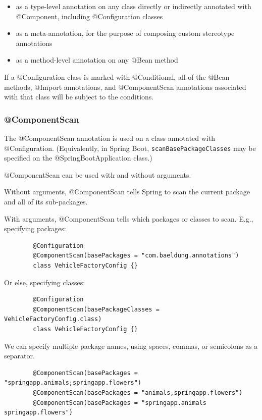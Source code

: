 \documentclass{scrartcl}
\begin{document}
\begin{itemize}
    \item as a type-level annotation on any class directly or indirectly annotated with @Component, including @Configuration classes
    \item as a meta-annotation, for the purpose of composing custom stereotype annotations
    \item as a method-level annotation on any @Bean method
\end{itemize}

If a @Configuration class is marked with @Conditional, all of the @Bean methods, @Import annotations, and @ComponentScan annotations associated with that class will be subject to the conditions.

\subsubsection{@ComponentScan}

    The @ComponentScan annotation is used on a class annotated with  @Configuration. (Equivalently, in Spring Boot,  \lstinline|scanBasePackageClasses| may be specified on the  @SpringBootApplication class.)

    @ComponentScan can be used with and without arguments.

    Without arguments, @ComponentScan  tells Spring to scan the current package and all of its sub-packages.

    With arguments, @ComponentScan tells which packages or classes to scan. E.g., specifying packages:

    \begin{lstlisting}
        @Configuration
        @ComponentScan(basePackages = "com.baeldung.annotations")
        class VehicleFactoryConfig {}
    \end{lstlisting}

    Or else, specifying classes:

    \begin{lstlisting}
        @Configuration
        @ComponentScan(basePackageClasses = VehicleFactoryConfig.class)
        class VehicleFactoryConfig {}
    \end{lstlisting}

    We can specify multiple package names, using spaces, commas, or semicolons as a separator.

    \begin{lstlisting}
        @ComponentScan(basePackages = "springapp.animals;springapp.flowers")
        @ComponentScan(basePackages = "animals,springapp.flowers")
        @ComponentScan(basePackages = "springapp.animals springapp.flowers")
    \end{lstlisting}
\end{document}
